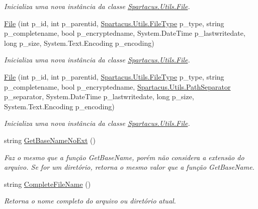 \begin{DoxyCompactItemize}
\begin{DoxyCompactList}\small\item\em Inicializa uma nova instância da classe \hyperlink{classSpartacus_1_1Utils_1_1File}{Spartacus.\+Utils.\+File}. \end{DoxyCompactList}\item 
\hyperlink{classSpartacus_1_1Utils_1_1File_a0f1ef7099d098ec3244be8a0dceee07b}{File} (int p\+\_\+id, int p\+\_\+parentid, \hyperlink{namespaceSpartacus_1_1Utils_a2bc44488e88db523cb2dcffaa6e77541}{Spartacus.\+Utils.\+File\+Type} p\+\_\+type, string p\+\_\+completename, bool p\+\_\+encryptedname, System.\+Date\+Time p\+\_\+lastwritedate, long p\+\_\+size, System.\+Text.\+Encoding p\+\_\+encoding)
\begin{DoxyCompactList}\small\item\em Inicializa uma nova instância da classe \hyperlink{classSpartacus_1_1Utils_1_1File}{Spartacus.\+Utils.\+File}. \end{DoxyCompactList}\item 
\hyperlink{classSpartacus_1_1Utils_1_1File_ae23d72186df34b5e7192b62c0e5318f1}{File} (int p\+\_\+id, int p\+\_\+parentid, \hyperlink{namespaceSpartacus_1_1Utils_a2bc44488e88db523cb2dcffaa6e77541}{Spartacus.\+Utils.\+File\+Type} p\+\_\+type, string p\+\_\+completename, bool p\+\_\+encryptedname, \hyperlink{namespaceSpartacus_1_1Utils_a9ee24558a33d60b42674bae3eed2a094}{Spartacus.\+Utils.\+Path\+Separator} p\+\_\+separator, System.\+Date\+Time p\+\_\+lastwritedate, long p\+\_\+size, System.\+Text.\+Encoding p\+\_\+encoding)
\begin{DoxyCompactList}\small\item\em Inicializa uma nova instância da classe \hyperlink{classSpartacus_1_1Utils_1_1File}{Spartacus.\+Utils.\+File}. \end{DoxyCompactList}\item 
string \hyperlink{classSpartacus_1_1Utils_1_1File_a6c209ce52f7803838ad5c5b62639e960}{Get\+Base\+Name\+No\+Ext} ()
\begin{DoxyCompactList}\small\item\em Faz o mesmo que a função Get\+Base\+Name, porém não considera a extensão do arquivo. Se for um diretório, retorna o mesmo valor que a função Get\+Base\+Name. \end{DoxyCompactList}\item 
string \hyperlink{classSpartacus_1_1Utils_1_1File_afd5b29174d563c6e89eaffd193f8f5ba}{Complete\+File\+Name} ()
\begin{DoxyCompactList}\small\item\em Retorna o nome completo do arquivo ou diretório atual. \end{DoxyCompactList}\item 

\end{DoxyCompactItemize}
